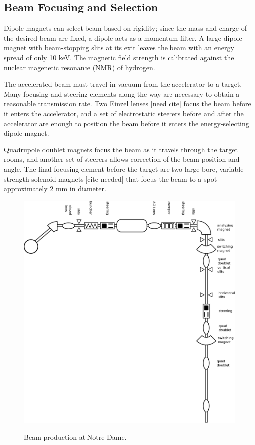\subsection{Beam Focusing and Selection}

Dipole magnets can select beam based on rigidity; since the mass and charge of the desired beam are fixed, a dipole acts as a momentum filter.  A large dipole magnet with beam-stopping slits at its exit leaves the beam with an energy spread of only 10 keV.  The magnetic field strength is calibrated against the nuclear magenetic resonance (NMR) of hydrogen. 

The accelerated beam must travel in vacuum from the accelerator to a target.  Many focusing and steering elements along the way are necessary to obtain a reasonable transmission rate.  Two Einzel lenses [need cite] focus the beam before it enters the accelerator, and a set of electrostatic steerers before and after the accelerator are enough to position the beam before it enters the energy-selecting dipole magnet.

Quadrupole doublet magnets focus the beam as it travels through the target rooms, and another set of steerers allows correction of the beam position and angle.  The final focusing element before the target are two large-bore, variable-strength solenoid magnets [cite needed] that focus the beam to a spot approximately 2 mm in diameter.

\begin{figure}[htp]
\centering
\includegraphics[width=1.0\textwidth]{figures/NSL_beamline.eps}
\label{fig:beamline}
\caption{Beam production at Notre Dame.}
\end{figure}

